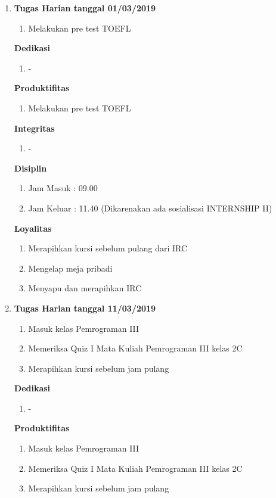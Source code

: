 \begin{enumerate}
\item \textbf{Tugas Harian tanggal 01/03/2019}
\begin{enumerate}
\item Melakukan pre test TOEFL
\end{enumerate}

\textbf{Dedikasi}
\begin{enumerate}
\item -
\end{enumerate}

\textbf{Produktifitas}
\begin{enumerate}
\item Melakukan pre test TOEFL
\end{enumerate}

\textbf{Integritas}
\begin{enumerate}
\item -
\end{enumerate}


\textbf{Disiplin}
\begin{enumerate}
\item Jam Masuk : 09.00
\item Jam Keluar : 11.40 (Dikarenakan ada sosialisasi INTERNSHIP II)
\end{enumerate}


\textbf{Loyalitas}
\begin{enumerate}
\item Merapihkan kursi sebelum pulang dari IRC
\item Mengelap meja pribadi
\item Menyapu dan merapihkan IRC
\end{enumerate}

\item \textbf{Tugas Harian tanggal 11/03/2019}
\begin{enumerate}
\item Masuk kelas Pemrograman III
\item Memeriksa Quiz I Mata Kuliah Pemrograman III kelas 2C
\item Merapihkan kursi sebelum jam pulang
\end{enumerate}

\textbf{Dedikasi}
\begin{enumerate}
\item -
\end{enumerate}

\textbf{Produktifitas}
\begin{enumerate}
\item Masuk kelas Pemrograman III
\item Memeriksa Quiz I Mata Kuliah Pemrograman III kelas 2C
\item Merapihkan kursi sebelum jam pulang
\end{enumerate}


\end{enumerate}

